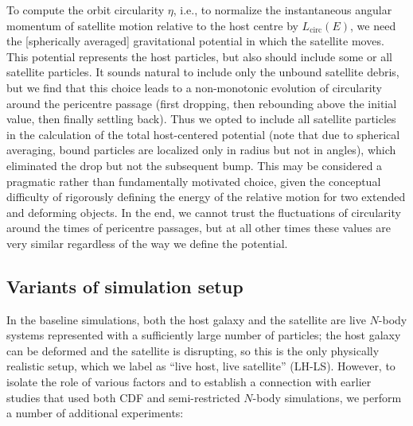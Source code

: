 \documentclass[twocolumn]{aastex63}
\newcommand{\LH}{\textsf{L\!H}\xspace}
\newcommand{\LS}{\textsf{L\!S}\xspace}
\begin{document}
To compute the orbit circularity $\eta$, i.e., to normalize the instantaneous angular momentum of satellite motion relative to the host centre by $L_\mathrm{circ}(E)$, we need the [spherically averaged] gravitational potential in which the satellite moves. This potential represents the host particles, but also should include some or all satellite particles. It sounds natural to include only the unbound satellite debris, but we find that this choice leads to a non-monotonic evolution of circularity around the pericentre passage (first dropping, then rebounding above the initial value, then finally settling back). Thus we opted to include all satellite particles in the calculation of the total host-centered potential (note that due to spherical averaging, bound particles are localized only in radius but not in angles), which eliminated the drop but not the subsequent bump. This may be considered a pragmatic rather than fundamentally motivated choice, given the conceptual difficulty of rigorously defining the energy of the relative motion for two extended and deforming objects. In the end, we cannot trust the fluctuations of circularity around the times of pericentre passages, but at all other times these values are very similar regardless of the way we define the potential.

\subsection{Variants of simulation setup}   \label{sec:variants}

In the baseline simulations, both the host galaxy and the satellite are live $N$-body systems represented with a sufficiently large number of particles; the host galaxy can be deformed and the satellite is disrupting, so this is the only physically realistic setup, which we label as ``live host, live satellite'' (\LH-\LS). However, to isolate the role of various factors and to establish a connection with earlier studies that used both CDF and semi-restricted $N$-body simulations, we perform a number of additional experiments:
\end{document}
